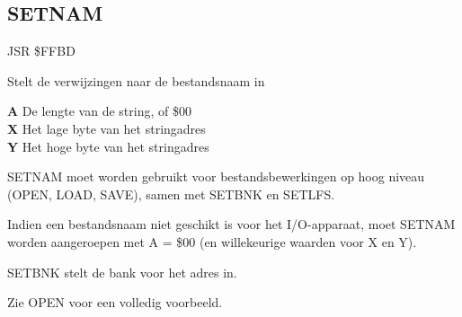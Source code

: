 \subsection{SETNAM}
\label{KERNAL Jump Table!SETNAM}
\begin{description}[leftmargin=2cm,style=nextline]
    \item [Adres:] JSR \$FFBD    \item [Omschrijving:] Stelt de verwijzingen naar de bestandsnaam in    \item [Invoer:]        \textbf{A} De lengte van de string, of \$00 \\        \textbf{X} Het lage byte van het stringadres \\        \textbf{Y} Het hoge byte van het stringadres    \item [Opmerkingen:]        SETNAM moet worden gebruikt voor bestandsbewerkingen op hoog niveau (OPEN, LOAD, SAVE), samen met SETBNK en SETLFS.

        Indien een bestandsnaam niet geschikt is voor het I/O-apparaat, moet SETNAM worden aangeroepen met A = \$00 (en willekeurige waarden voor X en Y).

        SETBNK stelt de bank voor het adres in.

        Zie OPEN voor een volledig voorbeeld.    \item [Voorbeeld:]
\end{description}



\newpage
